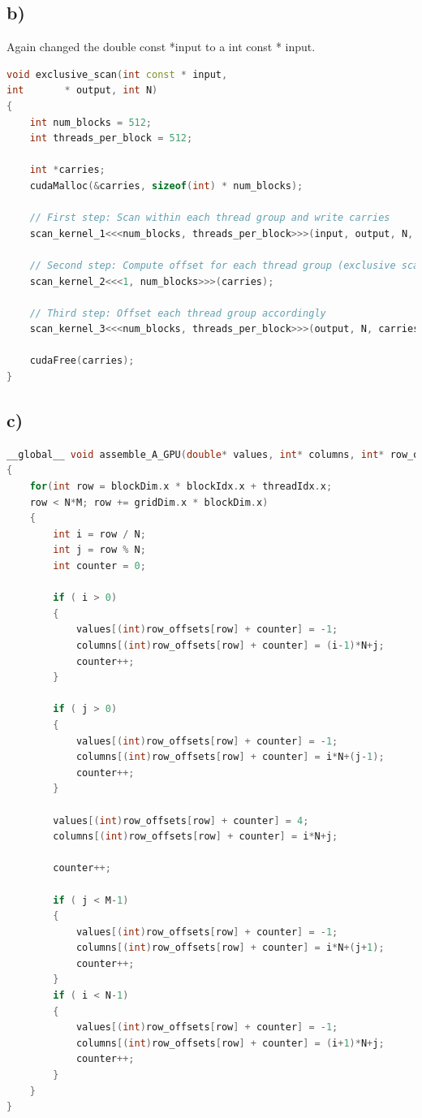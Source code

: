 \documentclass[11pt,a4paper]{article}
\begin{document}
\subsection*{b)}
Again changed the double const *input to a int const * input.
\begin{lstlisting}[language=C++, caption={given exclusive scan)}]
void exclusive_scan(int const * input,
int       * output, int N)
{
	int num_blocks = 512;
	int threads_per_block = 512;
	
	int *carries;
	cudaMalloc(&carries, sizeof(int) * num_blocks);
	
	// First step: Scan within each thread group and write carries
	scan_kernel_1<<<num_blocks, threads_per_block>>>(input, output, N, carries);
	
	// Second step: Compute offset for each thread group (exclusive scan for each thread group)
	scan_kernel_2<<<1, num_blocks>>>(carries);
	
	// Third step: Offset each thread group accordingly
	scan_kernel_3<<<num_blocks, threads_per_block>>>(output, N, carries);
	
	cudaFree(carries);
}
\end{lstlisting}
\subsection*{c)}
\begin{lstlisting}[language=C++, caption={assemble the matrix A)}]
__global__ void assemble_A_GPU(double* values, int* columns, int* row_offsets, int N, int M) 
{
	for(int row = blockDim.x * blockIdx.x + threadIdx.x; 
	row < N*M; row += gridDim.x * blockDim.x) 
	{
		int i = row / N;
		int j = row % N;
		int counter = 0;
		
		if ( i > 0) 
		{
			values[(int)row_offsets[row] + counter] = -1;
			columns[(int)row_offsets[row] + counter] = (i-1)*N+j;
			counter++;
		}
		
		if ( j > 0) 
		{
			values[(int)row_offsets[row] + counter] = -1;
			columns[(int)row_offsets[row] + counter] = i*N+(j-1);
			counter++;
		}
		
		values[(int)row_offsets[row] + counter] = 4;
		columns[(int)row_offsets[row] + counter] = i*N+j;
		
		counter++;
		
		if ( j < M-1) 
		{
			values[(int)row_offsets[row] + counter] = -1;
			columns[(int)row_offsets[row] + counter] = i*N+(j+1);
			counter++;
		}
		if ( i < N-1) 
		{
			values[(int)row_offsets[row] + counter] = -1;
			columns[(int)row_offsets[row] + counter] = (i+1)*N+j;
			counter++;
		}
	}
}
\end{lstlisting}
\newpage
\end{document}
